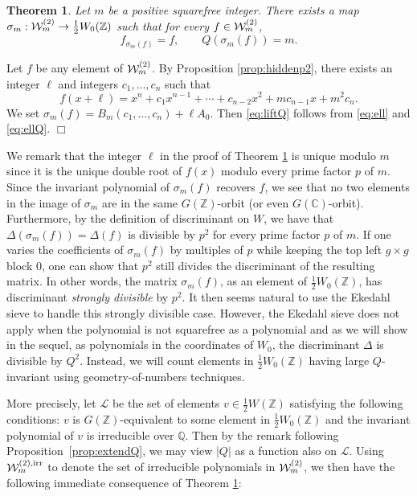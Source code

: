 \documentclass[11pt]{article}
\def\Z{{\mathbb Z}}
\def\irr{{\rm irr}}
\def\Q{{\mathbb Q}}
\def\C{{\mathcal C}}
\def\U{{\mathcal W}}
\def\Z{{\mathbb Z}}
\def\Q{{\mathbb Q}}
\def\C{{\mathbb C}}
\def\LL{{\mathcal L}}
\def\w{{\rm {(2)}}}
\newtheorem{theorem}{Theorem}[section]
\newenvironment{proof}{\noindent {\bf Proof:}}{$\Box$ \vspace{2 ex}}
\begin{document}
\begin{theorem}\label{keymap}
Let $m$ be a positive squarefree integer. There exists a map
$\sigma_m:\U_m^\w\to \frac12W_0(\Z)$ such that for every $f\in \U_m^\w$,
\begin{equation}\label{eq:liftQ}
f_{\sigma_m(f)}=f,\qquad Q(\sigma_m(f)) = m.
\end{equation}
\end{theorem}

\begin{proof}
Let $f$ be any element of $\U_m^\w$. By Proposition \ref{prop:hiddenp2}, there exists an integer $\ell$ and integers $c_1,\ldots,c_n$ such that
$$f(x+\ell) = x^n + c_1x^{n-1} + \cdots + c_{n-2}x^2 + mc_{n-1}x + m^2c_n.$$
We set $\sigma_m(f) = B_m(c_1,\ldots,c_n) + \ell A_0$. Then \eqref{eq:liftQ} follows from  \eqref{eq:ell} and \eqref{eq:ellQ}.
\end{proof}

We remark that the integer $\ell$ in the proof of Theorem \ref{keymap}
is unique modulo $m$ since it is the unique double root of $f(x)$
modulo every prime factor $p$ of $m$. Since the invariant polynomial
of $\sigma_m(f)$ recovers $f$, we see that no two elements in the
image of $\sigma_m$ are in the same $G(\Z)$-orbit (or even
$G(\C)$-orbit). Furthermore, by the definition of discriminant on $W$,
we have that $\Delta(\sigma_m(f))=\Delta(f)$ is divisible by $p^2$ for
every prime factor $p$ of $m$. If one varies the coefficients of
$\sigma_m(f)$ by multiples of $p$ while keeping the top left $g\times
g$ block $0$, one can show that $p^2$ still divides the discriminant
of the resulting matrix. In other words, the matrix $\sigma_m(f)$, as
an element of $\frac12 W_0(\Z)$, has discriminant \emph{strongly
  divisible} by $p^2$. It then seems natural to use the Ekedahl sieve
to handle this strongly divisible case. However, the Ekedahl sieve
does not apply when the polynomial is not squarefree as a polynomial
and as we will show in the sequel, as polynomials in the coordinates
of $W_0$, the discriminant $\Delta$ is divisible by $Q^2$. Instead, we
will count elements in $\frac12W_0(\Z)$ having large $Q$-invariant
using geometry-of-numbers techniques.

More precisely, let $\LL$ be the set of elements $v\in \frac12W(\Z)$
satisfying the following conditions: $v$ is $G(\Z)$-equivalent to some
element in $\frac12W_0(\Z)$ and the invariant polynomial of $v$ is
irreducible over $\Q$.  Then by the remark following
Proposition~\ref{prop:extendQ}, we may view $|Q|$ as a function also
on $\LL$.  Using $\U_m^{\w,\irr}$ to denote the set of irreducible
polynomials in $\U_m^\w$, we then have the following immediate
consequence of Theorem \ref{keymap}:
\end{document}

